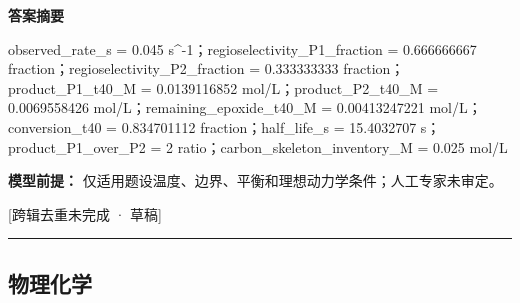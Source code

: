 \documentclass[UTF8,11pt,a4paper]{ctexart}
\begin{document}
\noindent\textbf{答案摘要}\par
observed\_rate\_s = 0.045 s\textasciicircum{}-1；regioselectivity\_P1\_fraction = 0.666666667 fraction；regioselectivity\_P2\_fraction = 0.333333333 fraction；product\_P1\_t40\_M = 0.0139116852 mol/L；product\_P2\_t40\_M = 0.0069558426 mol/L；remaining\_epoxide\_t40\_M = 0.00413247221 mol/L；conversion\_t40 = 0.834701112 fraction；half\_life\_s = 15.4032707 s；product\_P1\_over\_P2 = 2 ratio；carbon\_skeleton\_inventory\_M = 0.025 mol/L\par
\noindent\textbf{模型前提：}
仅适用题设温度、边界、平衡和理想动力学条件；人工专家未审定。\par
\noindent\textcolor{red!65!black}{[跨辑去重未完成 · 草稿]} \par
\medskip\hrule\medskip
\subsection*{物理化学}
\end{document}
